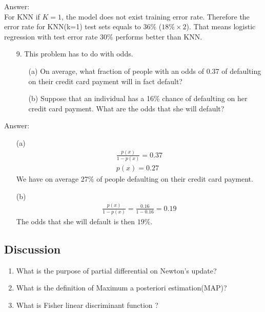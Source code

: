\documentclass[12pt,a4paper]{article}%
\theoremstyle{definition}
\theoremstyle{plain}
\numberwithin{equation}{section}
\begin{document}
\begin{oframed}
Answer:~\\
For KNN if $K=1$, the model does not exist training error rate. Therefore the error rate for KNN(k=1) test sets equals to 36\% ($18\% \times 2 $).
That means logistic regression with test error rate 30\% performs better than KNN.
\end{oframed}

\begin{enumerate}
\item[9.] This problem has to do with odds.
\begin{enumerate}
\item[(a)] On average, what fraction of people with an odds of 0.37 of defaulting on their credit card payment will in fact default?
\item[(b)] Suppose that an individual has a 16\% chance of defaulting on her credit card payment. What are the odds that she will default?
\end{enumerate}
\end{enumerate}

\begin{oframed}
Answer:
\begin{enumerate}
\item[(a)] 
\begin{gather*}
\frac{p(x)}{1-p(x)} = 0.37 \\
p(x) = 0.27
\end{gather*}
We have on average 27\% of people defaulting on their credit card payment.
\item[(b)] 
\begin{gather*}
\frac{p(x)}{1-p(x)} = \frac{0.16}{1-0.16} = 0.19
\end{gather*}
The odds that she will default is then \(19\%\).
\end{enumerate}
\end{oframed}
\subsection{Discussion}
\begin{enumerate}
\item What is the purpose of partial differential on Newton's update?
\item What is the definition of Maximum a posteriori estimation(MAP)?
\item What is Fisher linear discriminant function ?
\end{enumerate}
\end{document}

